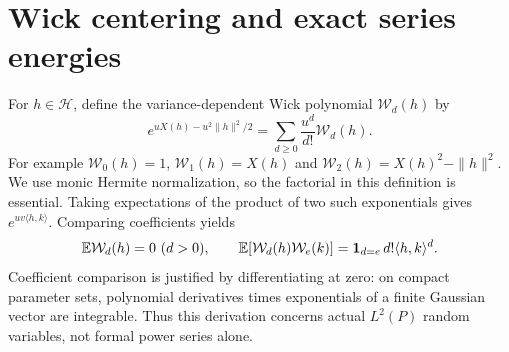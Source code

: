 \documentclass[11pt]{article}
\newcommand{\Hh}{\mathcal H}\newcommand{\tr}{\operatorname{tr}}
\begin{document}
\section{Wick centering and exact series energies}
For $h\in\Hh$, define the variance-dependent Wick polynomial
$\mathcal W_d(h)$ by
\begin{equation}\label{eq:wickgen}
 e^{uX(h)-u^2\|h\|^2/2}
   =\sum_{d\geq0}\frac{u^d}{d!}\mathcal W_d(h).
\end{equation}
For example $\mathcal W_0(h)=1$, $\mathcal W_1(h)=X(h)$ and
$\mathcal W_2(h)=X(h)^2-\|h\|^2$. We use monic Hermite normalization,
so the factorial in this definition is essential.
Taking expectations of the product of two such exponentials gives
$e^{uv\langle h,k\rangle}$. Comparing coefficients yields
\begin{equation}\label{eq:wickcov}
 \mathbb E\mathcal W_d(h)=0\ (d>0),\qquad
 \mathbb E[\mathcal W_d(h)\mathcal W_e(k)]
  =\mathbf1_{d=e}\,d!\langle h,k\rangle^d.
\end{equation}
Coefficient comparison is justified by differentiating at zero: on
compact parameter sets, polynomial derivatives times exponentials of
a finite Gaussian vector are integrable. Thus this derivation concerns
actual $L^2(P)$ random variables, not formal power series alone.
\end{document}
